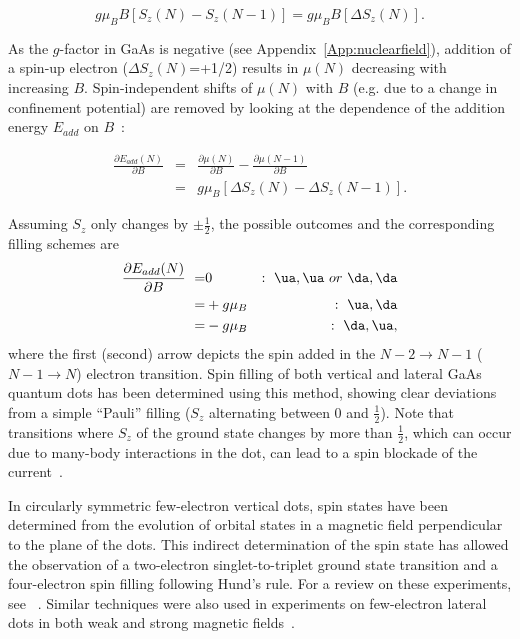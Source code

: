 \documentclass[12pt,aps,nofootinbib]{revtex4-1}
\begin{document}
\begin{equation}
     g \mu_B B \left[S_z(N)-S_z(N\!-\!1)\right] = g \mu_B B \left[ \Delta S_z(N)\right].
\end{equation}

As the $g$-factor in GaAs is negative (see
Appendix~\ref{App:nuclearfield}), addition of a spin-up electron
($\Delta S_z(N)$=+1/2) results in $\mu(N)$ decreasing with
increasing $B$. Spin-independent shifts of $\mu(N)$ with $B$ (e.g.
due to a change in confinement potential) are removed by looking
at the dependence of the addition energy $E_{add}$ on
$B$~\cite{WeisPRL1993}:

\begin{eqnarray}
    \frac{\partial E_{add}(N)}{\partial B}&=&\frac{\partial\mu(N)}{\partial B}-\frac{\partial\mu(N\!-\!1)}{\partial B}\nonumber \\
    &=& g \mu_B \left[ \Delta S_z(N)-\Delta S_z(N\!-\!1) \right].
\end{eqnarray}

Assuming $S_z$ only changes by $\pm\frac{1}{2}$, the possible
outcomes and the corresponding filling schemes are
\begin{eqnarray*}
 \frac{\partial E_{add}(N)}{\partial B}\ =&0 &:\ \ua, \ua \ or\ \da , \da \\
=& +g \mu_B &:\ \ua, \da \\
=& -g \mu_B &:\ \da , \ua ,
\end{eqnarray*}
where the first (second) arrow depicts the spin added in the
$N\!-\!2 \rightarrow N\!-\!1$ ($N\!-\!1 \rightarrow N$) electron
transition. Spin filling of both vertical \cite{Sasaki98} and
lateral GaAs quantum dots \cite{Duncan00,Lindmann02,PotokPRL2003}
has been determined using this method, showing clear deviations
from a simple ``Pauli'' filling ($S_z$ alternating between 0 and
$\frac{1}{2}$). Note that transitions where $S_z$ of the ground state changes by more
than $\frac{1}{2}$, which can occur due to many-body interactions in the dot, can lead to a spin blockade of the
current~\cite{Weinmann, KorkusinskiPRL2004}.

In circularly symmetric few-electron vertical dots, spin states
have been determined from the evolution of orbital states in a
magnetic field perpendicular to the plane of the dots. This
indirect determination of the spin state has allowed the
observation of a two-electron singlet-to-triplet ground state
transition and a four-electron spin filling following Hund's rule.
For a review on these experiments, see ~\textcite{kouwenhoven01}.
Similar techniques were also used in experiments on few-electron lateral dots in both weak and strong magnetic fields~\cite{CiorgaPRB2000,Kyriakidis02}.
\end{document}
